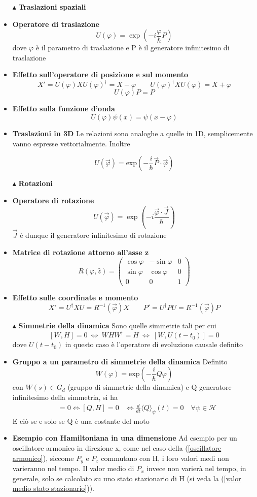 \documentclass{book}
\newcommand{\g}{\textbf}
\newcommand{\e}{\begin{equation}}
\newcommand{\ex}{\end{equation} }
\renewcommand{\it}{\item[$\cdot$]}
\begin{document}
\begin{multicols}{4}
\begin{itemize}
\item [$\blacktriangle$] \g{Traslazioni spaziali}
    \it \g{Operatore di traslazione}
        \e{U(\varphi) = \exp\left(-i\frac{\varphi}{\hbar} P\right)} \ex
        dove $\varphi$ è il parametro di traslazione e P è il generatore infinitesimo di traslazione
        \it \g{Effetto sull'operatore di posizione e sul momento}
        \e{X' = U(\varphi)XU(\varphi)^{\dagger} = X -\varphi \qquad U(\varphi)^{\dagger}XU(\varphi) = X +\varphi}\ex
        \e{U(\varphi) P = P} \ex
    \it \g{Effetto sulla funzione d'onda}
        \e{U(\varphi)\psi(x) = \psi(x - \varphi)} \ex
    \it \g{Traslazioni in 3D}
    Le relazioni sono analoghe a quelle in 1D, semplicemente vanno espresse vettorialmente. Inoltre
    
     \e{U(\vec{\varphi}) = \text{exp}\left(-\frac{i}{\hbar}\vec{P}\cdot \vec{\varphi}\right)}\ex
\item [$\blacktriangle$] \g{Rotazioni}
    \it \g{Operatore di rotazione}
        \e{U(\vec{\varphi}) = \exp\left(-i\frac{\vec{\varphi} \cdot \vec{J}}{\hbar}\right)} \ex
        $\vec{J}$ è dunque il generatore infinitesimo di rotazione
        
    \it \g{Matrice di rotazione attorno all'asse z}
        \e{R(\varphi, \hat{z}) = 
        \begin{pmatrix}
            \cos\varphi & -\sin\varphi & 0\\ 
            \sin\varphi & \cos\varphi & 0 \\
            0 & 0 & 1
        \end{pmatrix}} \ex
    \it \g{Effetto sulle coordinate e momento}
        \e{X' = U^\dagger X U = R^{-1}(\vec{\varphi}) X \qquad P' = U^\dagger P U = R^{-1}(\vec{\varphi}) P} \ex

    \item[$\blacktriangle$] \g{Simmetrie della dinamica}
Sono quelle simmetrie tali per cui
\e{[W,H] = 0 \ \iff \ WHW^{\dagger} = H \ \iff \ [W, U(t-t_{0})] = 0}\ex
dove $U(t-t_{0})$ in questo caso è l'operatore di evoluzione causale definito 
\it \g{Gruppo a un parametro di simmetrie della dinamica}
Definito 
\e{W(\varphi) = \text{exp}\left(-\frac{i}{\hbar}Q\varphi\right)}\ex con $W(s) \in G_{d}$ (gruppo di simmetrie della dinamica) e Q generatore infinitesimo della simmetria, si ha 
\begin{align}
    [W(s), H] &= 0 \iff [Q, H] = 0 
    &\iff \frac{d}{dt} \langle Q \rangle_{\psi}(t) = 0 \quad \forall \psi \in \mathcal{H}
\end{align}
E ciò se e solo se Q è una costante del moto
\it \g{Esempio con Hamiltoniana in una dimensione}
Ad esempio per un oscillatore armonico in direzione x, come nel caso della (\ref{oscillatore armonico}), siccome $P_{y}$ e $P_{z}$ commutano con H, i loro valori medi non varieranno nel tempo. Il valor medio di $P_{x}$ invece non varierà nel tempo, in generale, solo se calcolato su uno stato stazionario di H (si veda la (\ref{valor medio stato stazionario})).


\end{itemize}
\end{multicols}
\end{document}
